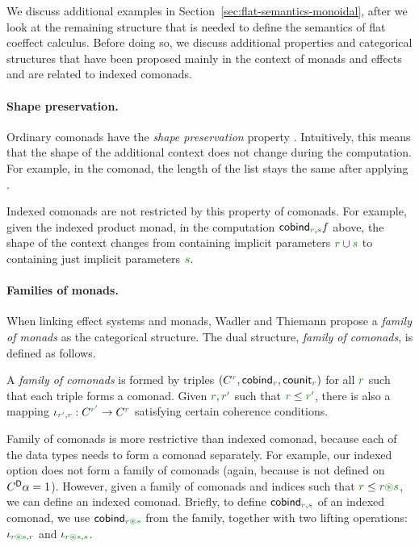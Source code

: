 We discuss additional examples in Section~\ref{sec:flat-semantics-monoidal}, after we look at the
remaining structure that is needed to define the semantics of flat coeffect calculus. Before doing 
so, we discuss additional properties and categorical structures that have been proposed mainly in 
the context of monads and effects and are related to indexed comonads.

\paragraph{Shape preservation.}
Ordinary comonads have the \emph{shape preservation} property \cite{comonads-codo}. Intuitively, 
this means that the shape of the additional context does not change during the computation. For
example, in the  comonad, the length of the list stays the same after applying 
.

Indexed comonads are not restricted by this property of comonads. For example, given the indexed
product monad, in the computation $\ident{cobind}_{\cclrd{r}, \cclrd{s}} f$ above, the shape of
the context changes from containing implicit parameters $\cclrd{r} \cup \cclrd{s}$  to containing
just implicit parameters $\cclrd{s}$.

\paragraph{Families of monads.}
When linking effect systems and monads, Wadler and Thiemann \cite{monad-notions} propose a
\emph{family of monads} as the categorical structure. The dual structure, \emph{family of
comonads}, is defined as follows.

\begin{definition}
\label{def:flat-family}
A \emph{family of comonads} is formed by triples $(\ctyp{\cclrd{r}}{}, \ident{cobind}_{\cclrd{r}}, 
  \ident{counit}_{\cclrd{r}})$ for all $\cclrd{r}$ such that each triple forms a comonad. Given 
$\cclrd{r}, \cclrd{r'}$ such that $\cclrd{r} \leq \cclrd{r'}$, there is also a mapping 
$\iota_{\cclrd{r'}, \cclrd{r}} : \ctyp{\cclrd{r'}}{} \rightarrow \ctyp{\cclrd{r}}{}$ satisfying
certain coherence conditions.
\end{definition}

Family of comonads is more restrictive than indexed comonad, because each of the data types needs
to form a comonad separately. For example, our indexed option does not form a family of comonads
(again, because  is not defined on $C^{\textnormal{\sffamily D}}\alpha=1$). However, given a 
family of comonads and indices such that $\cclrd{r} \leq \cclrd{r}\cseq\cclrd{s}$, we can define 
an indexed comonad. Briefly, to define $\ident{cobind}_{\cclrd{r},\cclrd{s}}$ of an indexed comonad, 
we use $\ident{cobind}_{\cclrd{r}\cseq\cclrd{s}}$ from the family, together with two lifting operations:
$\iota_{\cclrd{r}\cseq\cclrd{s}, \cclrd{r}}$ and $\iota_{\cclrd{r}\cseq\cclrd{s}, \cclrd{s}}$.

